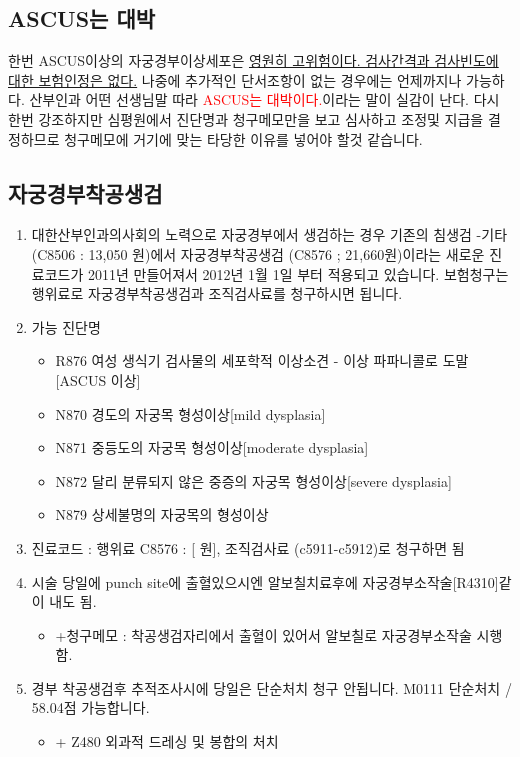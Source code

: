 \subsection{ASCUS는 대박}
한번 ASCUS이상의 자궁경부이상세포은 \uline{영원히 고위험이다. 검사간격과 검사빈도에 대한 보험인정은 없다.} 나중에 추가적인 단서조항이 없는 경우에는 언제까지나 가능하다. 산부인과 어떤 선생님말 따라 \textcolor{red}{ASCUS는 대박이다.}이라는 말이 실감이 난다. 다시 한번 강조하지만 심평원에서 진단명과 청구메모만을 보고 심사하고 조정및 지급을 결정하므로 청구메모에 거기에 맞는 타당한 이유를 넣어야 할것 같습니다.

\subsection{자궁경부착공생검}
\begin{enumerate}\tightlist
\item 대한산부인과의사회의 노력으로 자궁경부에서 생검하는 경우 기존의 침생검 -기타 (C8506 : 13,050 원)에서 자궁경부착공생검 (C8576 ; 21,660원)이라는 새로운 진료코드가 2011년 만들어져서 2012년 1월 1일 부터 적용되고 있습니다. 보험청구는 행위료로 자궁경부착공생검과 조직검사료를 청구하시면 됩니다.
\item 가능 진단명
	\begin{itemize}\tightlist
	\item R876 여성 생식기 검사물의 세포학적 이상소견 - 이상 파파니콜로 도말[ASCUS 이상]
	\item N870 경도의 자궁목 형성이상[mild dysplasia]
	\item N871 중등도의 자궁목 형성이상[moderate dysplasia]
	\item N872 달리 분류되지 않은 중증의 자궁목 형성이상[severe dysplasia]
	\item N879 상세불명의 자궁목의 형성이상
	\end{itemize}
\item 진료코드 : 행위료 C8576 : [ 원], 조직검사료 (c5911-c5912)로 청구하면 됨
\item 시술 당일에 punch site에 출혈있으시엔 알보칠치료후에 자궁경부소작술[R4310]같이 내도 됨.
	\begin{itemize}\tightlist
	\item +청구메모 : 착공생검자리에서 출혈이 있어서 알보칠로 자궁경부소작술 시행함. 
	\end{itemize}
\item 경부 착공생검후 추적조사시에 당일은 단순처치 청구 안됩니다. M0111 단순처치 / 58.04점 가능합니다.
	\begin{itemize}\tightlist
	\item + Z480 외과적 드레싱 및 봉합의 처치
	\end{itemize}
\end{enumerate}
